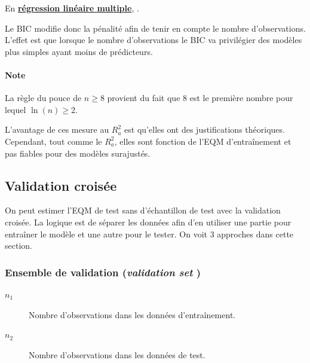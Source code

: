 \documentclass[french]{article}
\begin{document}
\begin{multicols*}{2}
\begin{definitionNOHFILL}
En \textbf{\underline{régression linéaire multiple}}, .

\bigskip

Le BIC \textcolor{burntsienna}{modifie donc la pénalité} afin de tenir en compte le nombre d'observations. L'effet est que lorsque le nombre d'observations  le BIC va privilégier des modèles plus simples ayant moins de prédicteurs.

\paragraph{Note}	La règle du pouce de $n \geq 8$ provient du fait que 8 est le première nombre pour lequel $\ln(n) \geq 2$.
\end{definitionNOHFILL}

\begin{rappel_enhanced}[Motivation]
L'avantage de ces mesure au $R^{2}_{a}$ est qu'elles ont des justifications théoriques. Cependant, tout comme le $R^{2}_{a}$, elles sont fonction de l'EQM d'entraînement et pas fiables pour des modèles surajustés.
\end{rappel_enhanced}




\columnbreak
\subsection{Validation croisée}\label{subsec:modSelCV}
\begin{rappel_enhanced}[Contexte]
On peut estimer l'EQM de test sans d'échantillon de test avec la validation croisée. La logique est de séparer les données afin d'en utiliser une partie pour entraîner le modèle et une autre pour le tester. On voit 3 approches dans cette section.
\end{rappel_enhanced}



\subsubsection{Ensemble de validation (\og \textit{validation set} \fg{})}
\begin{distributions}[Notation]
\begin{description}
	\item[$n_{1}$]	Nombre d'observations dans les données d'entraînement.
	\item[$n_{2}$]	Nombre d'observations dans les données de test.
\end{description}
\end{distributions}


\end{multicols*}
\end{document}
